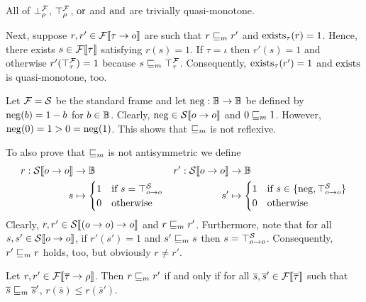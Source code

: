 \documentclass[a4paper,twoside,notitlepage,openright,11pt]{report}
\begin{document}
\begin{example}
  \begin{thmlist}
  \item\label{ex:qmlog1} All of $\bot^\mathcal F_\rho$, $\top^\mathcal F_\rho$, $\operatorname{or}$ and $\operatorname{and}$ are trivially quasi-monotone.
  \item\label{ex:qmlog2} Next, suppose $r,r'\in{\mathcal F}\llbracket\tau\to o\rrbracket$ are such that $r\sqsubseteq_m r'$ and $\operatorname{exists}_\tau(r)=1$. Hence, there exists $s\in{\mathcal F}\llbracket\tau\rrbracket$ satisfying $r(s)=1$. If $\tau=\iota$ then $r'(s)=1$ and otherwise $r'(\top_\tau^\mathcal F)=1$ because $s\sqsubseteq_m\top^\mathcal F_\tau$. Consequently, $\operatorname{exists}_\tau(r')=1$ and $\operatorname{exists}$ is quasi-monotone, too.
  \item\label{ex:qmnotrt} Let $\mathcal F=\mathcal S$ be the standard frame and let $\operatorname{neg}:\mathbb B\to\mathbb B$ be defined by $\operatorname{neg}(b)=1-b$ for $b\in\mathbb B$. Clearly, $\operatorname{neg}\in{\mathcal S}\llbracket o\to o\rrbracket$ and $0\sqsubseteq_m 1$. However, $\operatorname{neg}(0)=1>0=\operatorname{neg}(1)$. This shows that $\sqsubseteq_m$ is not reflexive.

  \item\label{ex:mnotas} To also prove that $\sqsubseteq_m$ is not antisymmetric we define
    \begin{align*}
      r:{\mathcal S}\llbracket o\to o\rrbracket&\to\mathbb B&r':{\mathcal S}\llbracket o\to o\rrbracket&\to\mathbb B\\
      s&\mapsto
         \begin{cases}
           1&\text{if }s=\top_{o\to o}^\mathcal S\\
           0&\text{otherwise}
         \end{cases}&
                      s'&\mapsto
                         \begin{cases}
                           1&\text{if }s\in\{\operatorname{neg},\top_{o\to o}^\mathcal S\}\\
                           0&\text{otherwise}
                         \end{cases}
    \end{align*}
    Clearly, $r,r'\in{\mathcal S}\llbracket(o\to o)\to o\rrbracket$ and $r\sqsubseteq_m r'$. Furthermore, note that for all $s,s'\in{\mathcal S}\llbracket o\to o\rrbracket$, if $r'(s')=1$ and $s'\sqsubseteq_m s$ then $s=\top_{o\to o}^\mathcal S$. Consequently, $r'\sqsubseteq_m r$ holds, too, but obviously $r\neq r'$. 
  \end{thmlist}
\end{example}
\begin{remark}
  \label{rem:mondefunfold}
  Let $r,r'\in{\mathcal F}\llbracket\overline\tau\to\rho\rrbracket$. Then $r\sqsubseteq_m r'$ if and only if for all $\overline s,\overline s'\in{\mathcal F}\llbracket\overline\tau\rrbracket$ such that $\overline s\sqsubseteq_m\overline s'$, $r(\overline s)\leq r(\overline s')$.
\end{remark}
\end{document}
